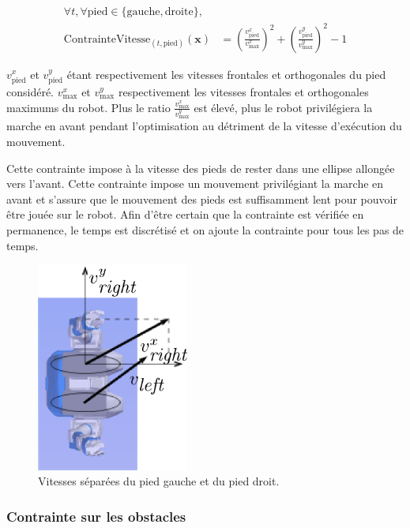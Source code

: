 \begin{equation}
  \begin{split}
  \forall t, \forall \text{pied} \in \{\text{gauche}, \text{droite}\}, &\\
  \text{ContrainteVitesse}_{(t,\text{pied})}(\mathbf{x}) & =
  (\frac{v_{\text{pied}}^{x}}{v_{\text{max}}^{x}})^2 +
  (\frac{v_{\text{pied}}^{y}}{v_{\text{max}}^{y}})^2 - 1
  \end{split}
\end{equation}

$v_{\text{pied}}^{x}$ et $v_{\text{pied}}^{y}$ étant respectivement
les vitesses frontales et orthogonales du pied
considéré. $v_{\text{max}}^x$ et $v_{\text{max}}^y$ respectivement les
vitesses frontales et orthogonales maximums du robot. Plus le ratio
$\frac{v_{\text{max}}^x}{v_{\text{max}}^y}$ est élevé, plus le robot
privilégiera la marche en avant pendant l'optimisation au détriment de
la vitesse d'exécution du mouvement.

Cette contrainte impose à la vitesse des pieds de rester dans une
ellipse allongée vers l'avant. Cette contrainte impose un mouvement
privilégiant la marche en avant et s'assure que le mouvement des pieds
est suffisamment lent pour pouvoir être jouée sur le robot. Afin
d'être certain que la contrainte est vérifiée en permanence, le temps
est discrétisé et on ajoute la contrainte pour tous les pas de temps.

\begin{figure}[htbp]
  \begin{center}
\includegraphics[width=5cm]{src/chap1-roboptim/speed-constraint-arrows.png}
  \end{center} \caption{Vitesses séparées du pied gauche et du pied
  droit. \label{fig:boxoptim}}
\end{figure}
\FloatBarrier


\subsubsection{Contrainte sur les obstacles}
\label{sec:chap1_roboptim_contraintes_obstacle}


